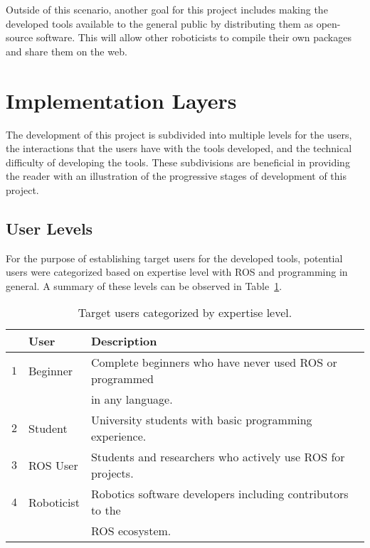     Outside of this scenario, another goal for this project includes making the 
    developed tools available to the general public by distributing them as
    open-source software. This will allow other roboticists to compile their own
    packages and share them on the web.


\section{Implementation Layers}

    The development of this project is subdivided into multiple levels for the 
    users, the interactions that the users have with the tools developed, and
    the technical difficulty of developing the tools. These subdivisions are
    beneficial in providing the reader with an illustration of the progressive stages of development of this project.


    \subsection{User Levels}

        For the purpose of establishing target users for the developed tools,
        potential users were categorized based on expertise level with \ac{ROS} 
        and programming in general. A summary of these levels can be  observed 
        in Table~\ref{tab:userlevels}.

        \begin{table}[htbp]
            \color{textColor}
            \centering	
            \caption{Target users categorized by expertise level.}
                \begin{tabular}{rll}
                    \toprule
                    & \textbf{User}   & \textbf{Description} \\
                    \midrule
                    $1$ & Beginner    & Complete beginners who have never used ROS or programmed \\
                    & & in any language. \\[0.5em]

                    $2$ & Student     & University students with basic programming experience. \\[0.5em]

                    $3$ & ROS User    & Students and researchers who actively use ROS for projects. \\[0.5em]

                    $4$ &  Roboticist & Robotics software developers including contributors to the \\
                    & & ROS ecosystem. \\
                \bottomrule
            \end{tabular}\label{tab:userlevels}
        \end{table}

